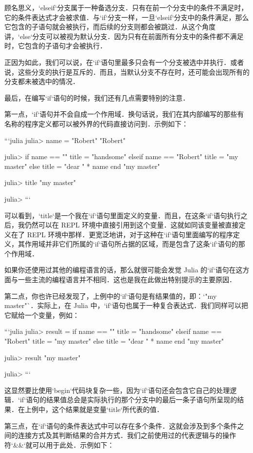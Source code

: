 顾名思义，`elseif`分支属于一种备选分支．只有在前一个分支中的条件不满足时，它的条件表达式才会被求值．与`if`分支一样，一旦`elseif`分支中的条件满足，那么它包含的子语句就会被执行，而后续的分支则都会被跳过．从这个角度讲，`else`分支可以被视为默认分支．因为只有在前面所有分支中的条件都不满足时，它包含的子语句才会被执行．

正因为如此，我们可以说，在`if`语句里最多只会有一个分支被选中并执行．或者说，这些分支的执行是互斥的．而且，当默认分支不存在时，还可能会出现所有的分支都未被选中的情况．

最后，在编写`if`语句的时候，我们还有几点需要特别的注意．

第一点，`if`语句并不会自成一个作用域．换句话说，我们在其内部编写的那些有名称的程序定义都可以被外界的代码直接访问到．示例如下：

```julia
julia> name = "Robert"
"Robert"

julia> if name == ""
           title = "handsome"
       elseif name == "Robert"
           title = "my master"
       else
           title = "dear " * name
       end
"my master"

julia> title
"my master"

julia> 
```

可以看到，`title`是一个我在`if`语句里面定义的变量．而且，在这条`if`语句执行之后，我仍然可以在 REPL 环境中直接引用到这个变量．这就如同该变量被直接定义在了 REPL 环境中那样．更宽泛地讲，对于这种在`if`语句里面编写的程序定义，其作用域并非它们所属的`if`语句所占据的区域，而是包含了这条`if`语句的那个作用域．

如果你还使用过其他的编程语言的话，那么就很可能会发觉 Julia 的`if`语句在这方面与一些主流的编程语言并不相同．这也是我在此做出特别提示的主要原因．

第二点，你也许已经发现了，上例中的`if`语句是有结果值的，即：`"my master"`．实际上，在 Julia 中，`if`语句也属于一种复合表达式．我们同样可以把它赋给一个变量，例如：

```julia
julia> result = if name == ""
           title = "handsome"
       elseif name == "Robert"
           title = "my master"
       else
           title = "dear " * name
       end
"my master"

julia> result
"my master"

julia> 
```

这显然要比使用`begin`代码块复杂一些，因为`if`语句还会包含它自己的处理逻辑．`if`语句的结果值总会是实际执行的那个分支中的最后一条子语句所呈现的结果．在上例中，这个结果就是变量`title`所代表的值．

第三点，在`if`语句的条件表达式中可以存在多个条件．这就会涉及到多个条件之间的连接方式及其判断结果的合并方式．我们之前使用过的代表逻辑与的操作符`&&`就可以用于此处．示例如下：

